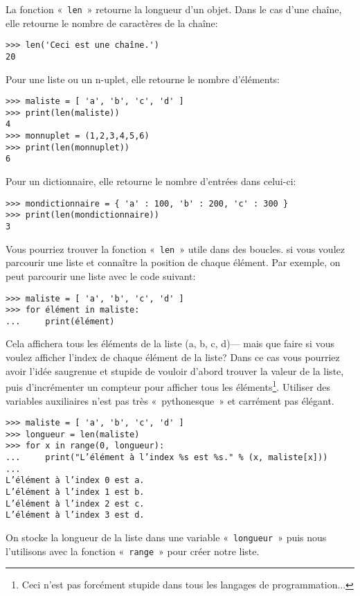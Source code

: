 La fonction «~\texttt{len}~» retourne la longueur d'un objet. Dans le cas d'une chaîne, elle retourne le nombre de caractères de la chaîne:
\begin{Verbatim}[frame=single,rulecolor=\color{gray}]
>>> len('Ceci est une chaîne.')
20
\end{Verbatim}

Pour une liste ou un n-uplet, elle retourne le nombre d'éléments:
\begin{Verbatim}[frame=single,rulecolor=\color{gray}]
>>> maliste = [ 'a', 'b', 'c', 'd' ]
>>> print(len(maliste))
4
>>> monnuplet = (1,2,3,4,5,6)
>>> print(len(monnuplet))
6
\end{Verbatim}

Pour un dictionnaire, elle retourne le nombre d'entrées dans celui-ci:
\begin{Verbatim}[frame=single,rulecolor=\color{gray}]
>>> mondictionnaire = { 'a' : 100, 'b' : 200, 'c' : 300 }
>>> print(len(mondictionnaire))
3
\end{Verbatim}

Vous pourriez trouver la fonction «~\texttt{len}~» utile dans des boucles.
si vous voulez parcourir une liste et connaître la position de chaque élément. Par exemple, on peut parcourir une liste avec le code suivant:
\begin{Verbatim}[frame=single,rulecolor=\color{gray}]
>>> maliste = [ 'a', 'b', 'c', 'd' ]
>>> for élément in maliste:
...     print(élément)
\end{Verbatim}
Cela affichera tous les éléments de la liste (a, b, c, d)--- mais que faire si vous voulez afficher l'index de chaque élément de la liste? Dans ce cas vous pourriez avoir l'idée saugrenue et stupide de vouloir d'abord trouver la valeur de la liste, puis d'incrémenter un compteur pour afficher tous les éléments\footnote{Ceci n'est pas forcément stupide dans tous les langages de programmation...}. Utiliser des variables auxiliaires n'est pas très «~pythonesque~» et carrément pas élégant.

\begin{Verbatim}[frame=single,rulecolor=\color{gray},label=Très moche!]
>>> maliste = [ 'a', 'b', 'c', 'd' ]
>>> longueur = len(maliste)
>>> for x in range(0, longueur):
...     print("L’élément à l’index %s est %s." % (x, maliste[x]))
... 
L’élément à l’index 0 est a.
L’élément à l’index 1 est b.
L’élément à l’index 2 est c.
L’élément à l’index 3 est d.
\end{Verbatim}

On stocke la longueur de la liste dans une variable «~\texttt{longueur}~» puis nous l'utilisons avec la fonction «~\texttt{range}~» pour créer notre liste.

